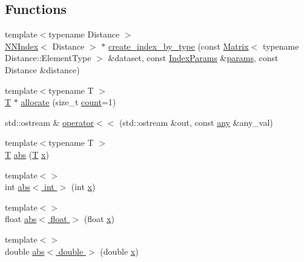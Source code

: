 \subsection*{Functions}
\begin{DoxyCompactItemize}
\item 
{\footnotesize template$<$typename Distance $>$ }\\\hyperlink{classcvflann_1_1NNIndex}{N\-N\-Index}$<$ Distance $>$ $\ast$ \hyperlink{namespacecvflann_a9aa649ee808a0b921f27d999a6cbabf7}{create\-\_\-index\-\_\-by\-\_\-type} (const \hyperlink{classcvflann_1_1Matrix}{Matrix}$<$ typename Distance\-::\-Element\-Type $>$ \&dataset, const \hyperlink{namespacecvflann_a742b4c7076c21012054af74a9ee48289}{Index\-Params} \&\hyperlink{compat_8hpp_a0480a03ecc41b20cde376602531d9270}{params}, const Distance \&distance)
\item 
{\footnotesize template$<$typename T $>$ }\\\hyperlink{calib3d_8hpp_a3efb9551a871ddd0463079a808916717}{T} $\ast$ \hyperlink{namespacecvflann_aac46b2b4f787bc0feaec5f283e22620a}{allocate} (size\-\_\-t \hyperlink{tracking_8hpp_a88d78b1935cd8bdee70a44eaaf326b1e}{count}=1)
\item 
std\-::ostream \& \hyperlink{namespacecvflann_a76b9cb6a1aa4ae54d00b17eccd32268e}{operator$<$$<$} (std\-::ostream \&out, const \hyperlink{structcvflann_1_1any}{any} \&any\-\_\-val)
\item 
{\footnotesize template$<$typename T $>$ }\\\hyperlink{calib3d_8hpp_a3efb9551a871ddd0463079a808916717}{T} \hyperlink{namespacecvflann_a51e0bdfcbd001afcf02cc5f812476488}{abs} (\hyperlink{calib3d_8hpp_a3efb9551a871ddd0463079a808916717}{T} \hyperlink{highgui__c_8h_a6150e0515f7202e2fb518f7206ed97dc}{x})
\item 
{\footnotesize template$<$$>$ }\\int \hyperlink{namespacecvflann_aa807e7dfee3eee783f8b34dd1aadc6ae}{abs$<$ int $>$} (int \hyperlink{highgui__c_8h_a6150e0515f7202e2fb518f7206ed97dc}{x})
\item 
{\footnotesize template$<$$>$ }\\float \hyperlink{namespacecvflann_ac33717f5c0444506f69a15d8e86bb3e9}{abs$<$ float $>$} (float \hyperlink{highgui__c_8h_a6150e0515f7202e2fb518f7206ed97dc}{x})
\item 
{\footnotesize template$<$$>$ }\\double \hyperlink{namespacecvflann_a4be1a31dcd0f78b8bb3663c26d20651b}{abs$<$ double $>$} (double \hyperlink{highgui__c_8h_a6150e0515f7202e2fb518f7206ed97dc}{x})

\end{DoxyCompactItemize}

